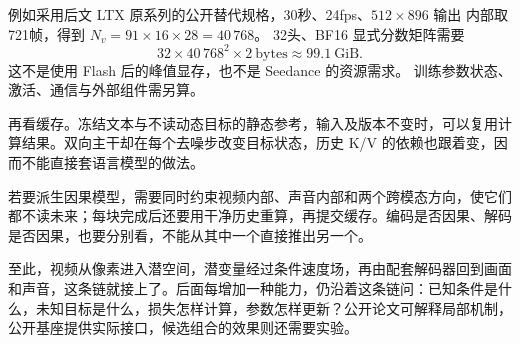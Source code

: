 例如采用后文 LTX 原系列的公开替代规格，30秒、24fps、$512\times896$ 输出
内部取721帧，得到 $N_v=91\times16\times28=40\,768$。
32头、BF16 显式分数矩阵需要
\[
32\times40\,768^2\times2\ \mathrm{bytes}\approx99.1\ \mathrm{GiB}.
\]
这不是使用 Flash 后的峰值显存，也不是 Seedance 的资源需求。
训练参数状态、激活、通信与外部组件需另算。

再看缓存。冻结文本与不读动态目标的静态参考，输入及版本不变时，可以复用计算结果。双向主干却在每个去噪步改变目标状态，历史 K/V 的依赖也跟着变，因而不能直接套语言模型的做法。

若要派生因果模型，需要同时约束视频内部、声音内部和两个跨模态方向，使它们都不读未来；每块完成后还要用干净历史重算，再提交缓存。编码是否因果、解码是否因果，也要分别看，不能从其中一个直接推出另一个。

至此，视频从像素进入潜空间，潜变量经过条件速度场，再由配套解码器回到画面和声音，这条链就接上了。后面每增加一种能力，仍沿着这条链问：已知条件是什么，未知目标是什么，损失怎样计算，参数怎样更新？公开论文可解释局部机制，公开基座提供实际接口，候选组合的效果则还需要实验。